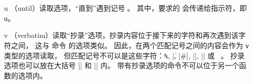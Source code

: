 \documentclass{l3doc}
\begin{document}
\begin{itemize}[font=\ttfamily]
\item[u] （until）读取选项，“直到”遇到记号 。
其中，要求的  会传递给指示符，即 \texttt{u}。
\item[v] （verbatim）读取“抄录”选项，抄录内容位于接下来的字符和再次遇到该字符之间，
这与 \LaTeXe{} 命令  的选项类似。
因此，在两个匹配记号之间的内容会作为 \texttt{v} 类型的选项读取，
但匹配记号不可以是这些字符：\verb|%|, |\|, |#|, |{|, |}| 或 \verb*| |。
抄录选项也可以放在大括号 |{| 和 |}| 内。
带有抄录选项的命令不可以位于另一个函数的选项内。
\end{itemize}
\end{document}
